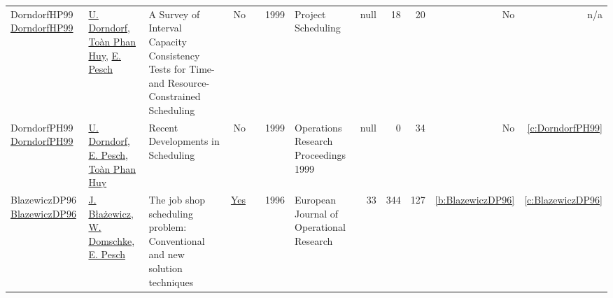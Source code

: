 {\begin{longtable}{>{\raggedright\arraybackslash}p{3cm}>{\raggedright\arraybackslash}p{6cm}>{\raggedright\arraybackslash}p{6.5cm}rrrp{2.5cm}rrrrr}
DorndorfHP99 \href{http://dx.doi.org/10.1007/978-1-4615-5533-9_10}{DorndorfHP99} & \hyperref[auth:a922]{U. Dorndorf}, \hyperref[auth:a923]{Toàn Phan Huy}, \hyperref[auth:a445]{E. Pesch} & A Survey of Interval Capacity Consistency Tests for Time- and Resource-Constrained Scheduling & No & \cite{DorndorfHP99} & 1999 & Project Scheduling & null & 18 & 20 & No & n/a\\
DorndorfPH99 \href{http://dx.doi.org/10.1007/978-3-642-58409-1_35}{DorndorfPH99} & \hyperref[auth:a922]{U. Dorndorf}, \hyperref[auth:a445]{E. Pesch}, \hyperref[auth:a923]{Toàn Phan Huy} & Recent Developments in Scheduling & No & \cite{DorndorfPH99} & 1999 & Operations Research Proceedings 1999 & null & 0 & 34 & No & \ref{c:DorndorfPH99}\\
BlazewiczDP96 \href{http://dx.doi.org/10.1016/0377-2217(95)00362-2}{BlazewiczDP96} & \hyperref[auth:a998]{J. Błażewicz}, \hyperref[auth:a999]{W. Domschke}, \hyperref[auth:a445]{E. Pesch} & The job shop scheduling problem: Conventional and new solution techniques & \href{works/BlazewiczDP96.pdf}{Yes} & \cite{BlazewiczDP96} & 1996 & European Journal of Operational Research & 33 & 344 & 127 & \ref{b:BlazewiczDP96} & \ref{c:BlazewiczDP96}\\
\end{longtable}
}

